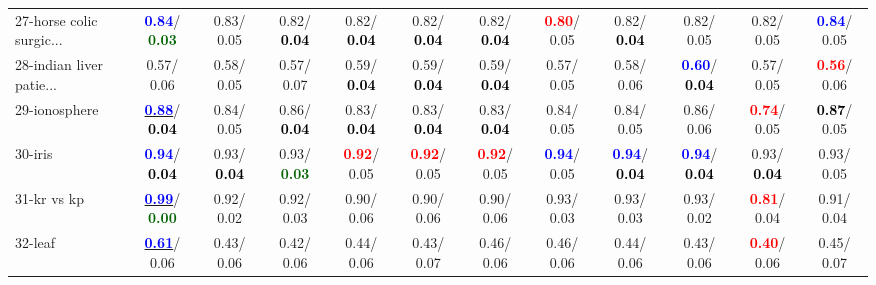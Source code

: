 \begin{table}[h]
\begin{center}
{\begin{tabular}{lc|c|c|c|c|c|c|c|c|c|c}
27-horse colic surgic... & \textcolor{blue}{\textbf{  0.84}}/\textcolor{darkgreen}{\textbf{  0.03}} &   0.83/  0.05 &   0.82/\textcolor{black}{\textbf{  0.04}} &   0.82/\textcolor{black}{\textbf{  0.04}} &   0.82/\textcolor{black}{\textbf{  0.04}} &   0.82/\textcolor{black}{\textbf{  0.04}} & \textcolor{red}{\textbf{  0.80}}/  0.05 &   0.82/\textcolor{black}{\textbf{  0.04}} &   0.82/  0.05 &   0.82/  0.05 & \textcolor{blue}{\textbf{  0.84}}/  0.05 \\
28-indian liver patie... &   0.57/  0.06 &   0.58/  0.05 &   0.57/  0.07 &   0.59/\textcolor{black}{\textbf{  0.04}} &   0.59/\textcolor{black}{\textbf{  0.04}} &   0.59/\textcolor{black}{\textbf{  0.04}} &   0.57/  0.05 &   0.58/  0.06 & \textcolor{blue}{\textbf{  0.60}}/\textcolor{black}{\textbf{  0.04}} &   0.57/  0.05 & \textcolor{red}{\textbf{  0.56}}/  0.06 \\ \hline
29-ionosphere & \underline{\textcolor{blue}{\textbf{  0.88}}}/\textcolor{black}{\textbf{  0.04}} &   0.84/  0.05 &   0.86/\textcolor{black}{\textbf{  0.04}} &   0.83/\textcolor{black}{\textbf{  0.04}} &   0.83/\textcolor{black}{\textbf{  0.04}} &   0.83/\textcolor{black}{\textbf{  0.04}} &   0.84/  0.05 &   0.84/  0.05 &   0.86/  0.06 & \textcolor{red}{\textbf{  0.74}}/  0.05 & \textcolor{black}{\textbf{  0.87}}/  0.05 \\
30-iris & \textcolor{blue}{\textbf{  0.94}}/\textcolor{black}{\textbf{  0.04}} &   0.93/\textcolor{black}{\textbf{  0.04}} &   0.93/\textcolor{darkgreen}{\textbf{  0.03}} & \textcolor{red}{\textbf{  0.92}}/  0.05 & \textcolor{red}{\textbf{  0.92}}/  0.05 & \textcolor{red}{\textbf{  0.92}}/  0.05 & \textcolor{blue}{\textbf{  0.94}}/  0.05 & \textcolor{blue}{\textbf{  0.94}}/\textcolor{black}{\textbf{  0.04}} & \textcolor{blue}{\textbf{  0.94}}/\textcolor{black}{\textbf{  0.04}} &   0.93/\textcolor{black}{\textbf{  0.04}} &   0.93/  0.05 \\
31-kr vs kp & \underline{\textcolor{blue}{\textbf{  0.99}}}/\textcolor{darkgreen}{\textbf{  0.00}} &   0.92/  0.02 &   0.92/  0.03 &   0.90/  0.06 &   0.90/  0.06 &   0.90/  0.06 &   0.93/  0.03 &   0.93/  0.03 &   0.93/  0.02 & \textcolor{red}{\textbf{  0.81}}/  0.04 &   0.91/  0.04 \\
32-leaf & \underline{\textcolor{blue}{\textbf{  0.61}}}/  0.06 &   0.43/  0.06 &   0.42/  0.06 &   0.44/  0.06 &   0.43/  0.07 &   0.46/  0.06 &   0.46/  0.06 &   0.44/  0.06 &   0.43/  0.06 & \textcolor{red}{\textbf{  0.40}}/  0.06 &   0.45/  0.07 \\\end{tabular}}\label{stratsBalAcc0aC4.5}
\end{center}
\end{table}
